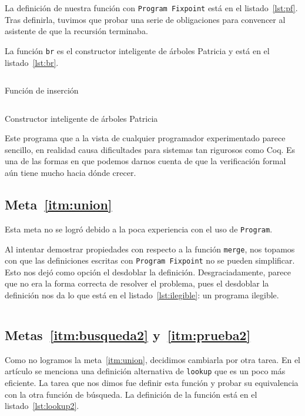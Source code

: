 \documentclass[11pt,letterpaper]{article}
\begin{document}
La definición de nuestra función con \texttt{Program Fixpoint} está en el listado~\ref{lst:pf}. Tras definirla, tuvimos que probar una serie de obligaciones para convencer al asistente de que la recursión terminaba.

La función \texttt{br} es el constructor inteligente de árboles Patricia y está en el listado~\ref{lst:br}.

\begin{listing}[H]
  \inputminted{coq}{src/ProgramFixpoint.v}
  \caption{Función de inserción}
  \label{lst:pf}
\end{listing}

\begin{listing}[H]
  \inputminted{coq}{src/br.v}
  \caption{Constructor inteligente de árboles Patricia}
  \label{lst:br}
\end{listing}


Este programa que a la vista de cualquier programador experimentado parece sencillo, en realidad causa dificultades para sistemas tan rigurosos como Coq. Es una de las formas en que podemos darnos cuenta de que la verificación formal aún tiene mucho hacia dónde crecer.

\subsection{Meta~\ref{itm:union}}
\noindent Esta meta no se logró debido a la poca experiencia con el uso de \texttt{Program}.

Al intentar demostrar propiedades con respecto a la función \texttt{merge}, nos topamos con que las definiciones escritas con \texttt{Program Fixpoint} no se pueden simplificar. Esto nos dejó como opción el desdoblar la definición. Desgraciadamente, parece que no era la forma correcta de resolver el problema, pues el desdoblar la definición nos da lo que está en el listado~\ref{lst:ilegible}: un programa ilegible.

  \inputminted{coq}{src/ilegible.v}
  \subsection{Metas~\ref{itm:busqueda2} y~\ref{itm:prueba2}}
  \noindent Como no logramos la meta~\ref{itm:union}, decidimos cambiarla por otra tarea. En el artículo se menciona una definición alternativa de \texttt{lookup} que es un poco más eficiente. La tarea que nos dimos fue definir esta función y probar su equivalencia con la otra función de búsqueda. La definición de la función está en el listado~\ref{lst:lookup2}.
\end{document}
